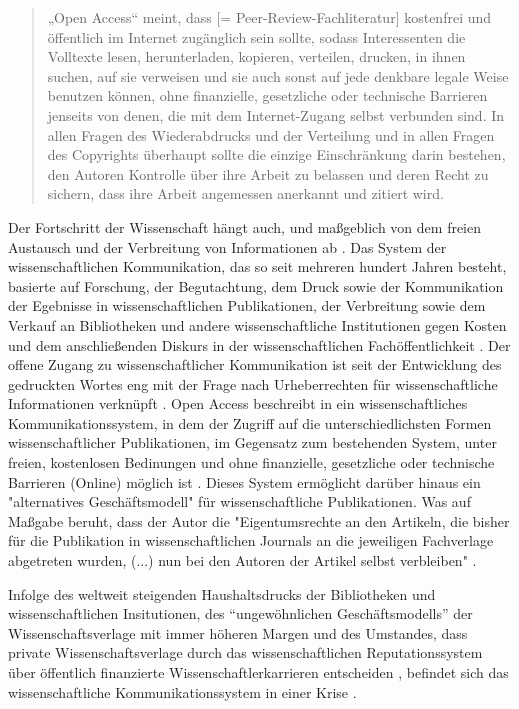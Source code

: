 \begin{quote}
„Open Access“ meint, dass [= Peer-Review-Fachliteratur] kostenfrei und öffentlich im Internet zugänglich sein sollte, sodass Interessenten die Volltexte lesen, herunterladen, kopieren, verteilen, drucken, in ihnen suchen, auf sie verweisen und sie auch sonst auf jede denkbare legale Weise benutzen können, ohne finanzielle, gesetzliche oder technische Barrieren jenseits von denen, die mit dem Internet-Zugang selbst verbunden sind. In allen Fragen des Wiederabdrucks und der Verteilung und in allen Fragen des Copyrights überhaupt sollte die einzige Einschränkung darin bestehen, den Autoren Kontrolle über ihre Arbeit zu belassen und deren Recht zu sichern, dass ihre Arbeit angemessen anerkannt und zitiert wird.
\cite{boai_2012}
\end{quote}

Der Fortschritt der Wissenschaft hängt auch, und maßgeblich von dem freien Austausch und der Verbreitung von Informationen ab \cite{cite:11}. Das System der wissenschaftlichen Kommunikation, das so seit mehreren hundert Jahren besteht, basierte auf Forschung, der Begutachtung, dem Druck sowie der Kommunikation der Egebnisse in wissenschaftlichen Publikationen, der Verbreitung sowie dem Verkauf an Bibliotheken und andere wissenschaftliche Institutionen gegen Kosten \cite{cite:11a} und dem anschließenden Diskurs in der wissenschaftlichen Fachöffentlichkeit \cite{suchen}. Der offene Zugang zu wissenschaftlicher Kommunikation ist seit der Entwicklung des gedruckten Wortes eng mit der Frage nach Urheberrechten für wissenschaftliche Informationen verknüpft \cite{Case_2000}. Open Access beschreibt in ein wissenschaftliches Kommunikationssystem, in dem der Zugriff auf die unterschiedlichsten Formen wissenschaftlicher Publikationen, im Gegensatz zum bestehenden System, unter freien, kostenlosen Bedinungen und ohne finanzielle, gesetzliche oder technische Barrieren (Online) möglich ist \cite{WD_bundestag_2009}. Dieses System ermöglicht darüber hinaus ein "alternatives Geschäftsmodell"\cite{lewis_2012_inevitability} für wissenschaftliche Publikationen. Was auf Maßgabe beruht, dass der Autor die "Eigentumsrechte an den Artikeln, die bisher für die Publikation in wissenschaftlichen Journals an die jeweiligen Fachverlage abgetreten wurden, (...) nun bei den Autoren der Artikel selbst verbleiben" \cite{Hess_2006}.

Infolge des weltweit steigenden Haushaltsdrucks der Bibliotheken und wissenschaftlichen Insitutionen, des “ungewöhnlichen Geschäftsmodells” \cite{cite:12} der Wissenschaftsverlage mit immer höheren Margen \cite{albert_2006_open_implications} und des Umstandes, dass private Wissenschaftsverlage durch das wissenschaftlichen Reputationssystem über öffentlich finanzierte Wissenschaftlerkarrieren entscheiden \cite{heise_2012}, befindet sich das wissenschaftliche Kommunikationssystem in einer Krise \cite{cite:14}.

